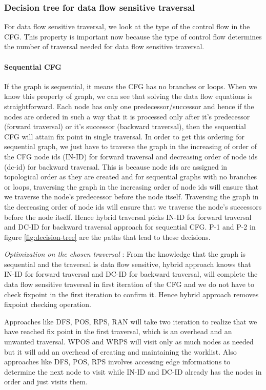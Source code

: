 \subsubsection{Decision tree for data flow sensitive traversal}
For data flow sensitive traversal, we look at the type of the control flow in
the CFG. This property is important now because the type of control flow
determines the number of traversal needed for data flow sensitive traversal.
\paragraph{Sequential CFG} \label{sec:decision-ds-seq}
If the graph is sequential, it means the CFG has no branches or loops. When we
know this property of graph, we can see that solving the data flow equations is
straightforward. Each node has only one predecessor/successor and hence if the
nodes are ordered in such a way that it is processed only after it's predecessor
(forward traversal) or it's successor (backward traversal), then the sequential
CFG will attain fix point in single traversal.
In order to get this ordering for sequential graph, we just have to traverse the
graph in the increasing of order of the CFG node ids (IN-ID) for forward
traversal and decreasing order of node ids (dc-id) for backward traversal. This
is because node ids are assigned in topological order as they are created and
for sequential graphs with no branches or loops, traversing the graph in the
increasing order of node ids will ensure that we traverse the node's predecessor
before the node itself. Traversing the graph in the decreasing order of node ids
will ensure that we traverse the node's successors before the node itself. Hence
hybrid traversal picks IN-ID for forward traversal and DC-ID for backward
traversal approach for sequential CFG. P-1 and P-2 in figure
\ref{fig:decision-tree} are the paths that lead to these decisions.\par
\textit{Optimization on the chosen traversal} : From the knowledge that the
graph is sequential and the traversal is data flow sensitive, hybrid approach
knows that IN-ID for forward traversal and DC-ID for backward traversal, will
complete the data flow sensitive traversal in first iteration of the CFG and we
do not have to check fixpoint in the first iteration to confirm it. Hence hybrid
approach removes fixpoint checking operation.\par

Approaches like DFS, POS, RPS, RAN will take two iteration to realize that we
have reached fix point in the first traversal, which is an overhead and an
unwanted traversal. WPOS and WRPS will visit only as much nodes as needed but it
will add an overhead of creating and maintaining the worklist. Also approaches
like DFS, POS, RPS involves accessing edge informations to determine the next
node to visit while IN-ID and DC-ID already has the nodes in order and just
visits them.\par

